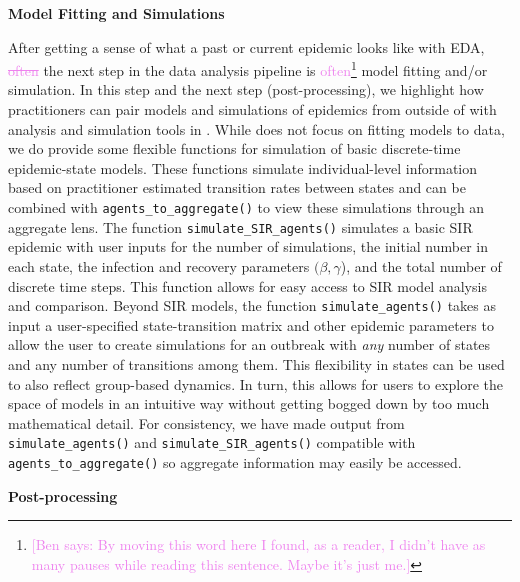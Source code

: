 \documentclass[
  shortnames]{jss}
\begin{document}
\textbf{Model Fitting and Simulations}

After getting a sense of what a past or current epidemic looks like with
EDA, \textcolor{violet}{\sout{often}} the next step in the data analysis
pipeline is
\textcolor{violet}{often}\footnote{\textcolor{violet}{[Ben says: By moving this word here I found, as a reader, I didn't have as many pauses while reading this sentence. Maybe it's just me.]}}
model fitting and/or simulation. In this step and the next step
(post-processing), we highlight how practitioners can pair models and
simulations of epidemics from outside of  with analysis
and simulation tools in . While  does
not focus on fitting models to data, we do provide some flexible
functions for simulation of basic discrete-time epidemic-state models.
These functions simulate individual-level information based on
practitioner estimated transition rates between states and can be
combined with \texttt{agents\_to\_aggregate()} to view these simulations
through an aggregate lens. The function \texttt{simulate\_SIR\_agents()}
simulates a basic SIR epidemic with user inputs for the number of
simulations, the initial number in each state, the infection and
recovery parameters \((\beta, \gamma\)), and the total number of
discrete time steps. This function allows for easy access to SIR model
analysis and comparison. Beyond SIR models, the function
\texttt{simulate\_agents()} takes as input a user-specified
state-transition matrix and other epidemic parameters to allow the user
to create simulations for an outbreak with \textit{any} number of states
and any number of transitions among them. This flexibility in states can
be used to also reflect group-based dynamics. In turn, this allows for
users to explore the space of models in an intuitive way without getting
bogged down by too much mathematical detail. For consistency, we have
made output from \texttt{simulate\_agents()} and
\texttt{simulate\_SIR\_agents()} compatible with
\texttt{agents\_to\_aggregate()} so aggregate information may easily be
accessed.

\textbf{Post-processing}
\end{document}
